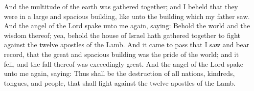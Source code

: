 And the multitude of the earth was gathered together; and I beheld that they were in a large and spacious building, like unto the building which my father saw. And the angel of the Lord spake unto me again, saying: Behold the world and the wisdom thereof; yea, behold the house of Israel hath gathered together to fight against the twelve apostles of the Lamb.
\bverse \iffalse And it came to pass that I saw and bear record, that the great and spacious building was the pride of the world; and it fell, and the fall thereof was exceedingly great. And the angel of the Lord spake unto me again, saying: Thus shall be the destruction of all nations, kindreds, tongues, and people, that shall fight against the twelve apostles of the Lamb. \fi
And it came to pass that I saw and bear record, that the great and spacious building was the pride of the world; and it fell, and the fall thereof was exceedingly great. And the angel of the Lord spake unto me again, saying: Thus shall be the destruction of all nations, kindreds, tongues, and people, that shall fight against the twelve apostles of the Lamb.

